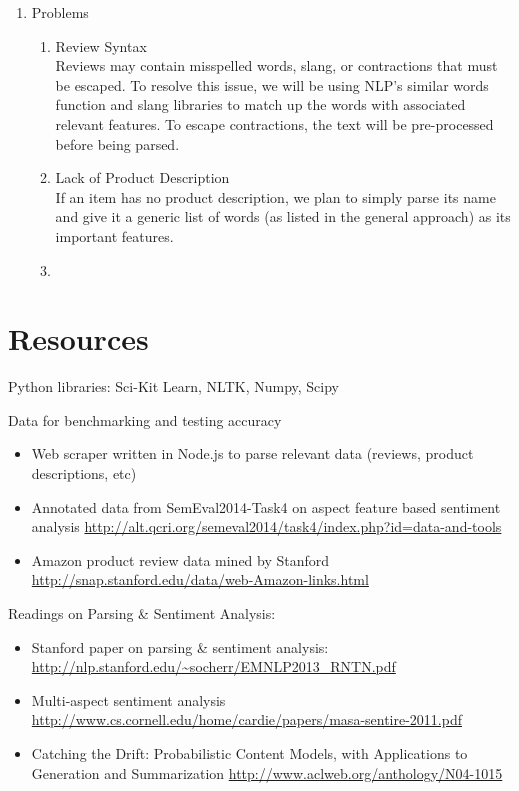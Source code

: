 \documentclass{article}
\begin{document}
\begin{enumerate}
\begin{enumerate} [label* = \arabic*.]
	\end{enumerate} 
\item Problems 
	\begin{enumerate} [label* = \arabic*.]
	\item Review Syntax \\
	Reviews may contain misspelled words, slang, or contractions that must be escaped. To resolve this issue, we will be using NLP's similar words function and slang libraries to match up the words with associated relevant features. To escape contractions, the text will be pre-processed before being parsed.
	\item Lack of Product Description \\
	If an item has no product description, we plan to simply parse its name and give it a generic list of words (as listed in the general approach) as its important features.
	\item 
	\end{enumerate}
\end{enumerate}

\section{Resources}

Python libraries: Sci-Kit Learn, NLTK, Numpy, Scipy

Data for benchmarking and testing accuracy

\begin{itemize}
\item Web scraper written in Node.js to parse relevant data (reviews, product descriptions, etc)
\newline 

\item Annotated data from SemEval2014-Task4 on aspect feature based sentiment analysis
\newline
\url{http://alt.qcri.org/semeval2014/task4/index.php?id=data-and-tools}

\item Amazon product review data mined by Stanford
\newline
\url{http://snap.stanford.edu/data/web-Amazon-links.html}
\end{itemize}

Readings on Parsing \& Sentiment Analysis:
\begin{itemize}
\item Stanford paper on parsing \& sentiment analysis:
\newline
\url{http://nlp.stanford.edu/~socherr/EMNLP2013_RNTN.pdf}

\item Multi-aspect sentiment analysis
\newline 
\url{http://www.cs.cornell.edu/home/cardie/papers/masa-sentire-2011.pdf}

\item Catching the Drift: Probabilistic Content Models, with Applications to
Generation and Summarization \newline
\url{http://www.aclweb.org/anthology/N04-1015}
\end{itemize}
\end{document}
